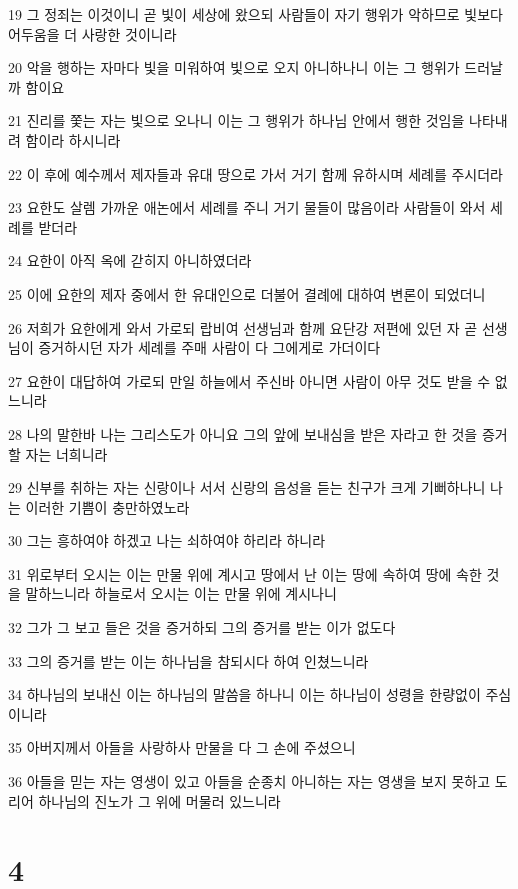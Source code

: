 \par 19 그 정죄는 이것이니 곧 빛이 세상에 왔으되 사람들이 자기 행위가 악하므로 빛보다 어두움을 더 사랑한 것이니라
\par 20 악을 행하는 자마다 빛을 미워하여 빛으로 오지 아니하나니 이는 그 행위가 드러날까 함이요
\par 21 진리를 쫓는 자는 빛으로 오나니 이는 그 행위가 하나님 안에서 행한 것임을 나타내려 함이라 하시니라
\par 22 이 후에 예수께서 제자들과 유대 땅으로 가서 거기 함께 유하시며 세례를 주시더라
\par 23 요한도 살렘 가까운 애논에서 세례를 주니 거기 물들이 많음이라 사람들이 와서 세례를 받더라
\par 24 요한이 아직 옥에 갇히지 아니하였더라
\par 25 이에 요한의 제자 중에서 한 유대인으로 더불어 결례에 대하여 변론이 되었더니
\par 26 저희가 요한에게 와서 가로되 랍비여 선생님과 함께 요단강 저편에 있던 자 곧 선생님이 증거하시던 자가 세례를 주매 사람이 다 그에게로 가더이다
\par 27 요한이 대답하여 가로되 만일 하늘에서 주신바 아니면 사람이 아무 것도 받을 수 없느니라
\par 28 나의 말한바 나는 그리스도가 아니요 그의 앞에 보내심을 받은 자라고 한 것을 증거할 자는 너희니라
\par 29 신부를 취하는 자는 신랑이나 서서 신랑의 음성을 듣는 친구가 크게 기뻐하나니 나는 이러한 기쁨이 충만하였노라
\par 30 그는 흥하여야 하겠고 나는 쇠하여야 하리라 하니라
\par 31 위로부터 오시는 이는 만물 위에 계시고 땅에서 난 이는 땅에 속하여 땅에 속한 것을 말하느니라 하늘로서 오시는 이는 만물 위에 계시나니
\par 32 그가 그 보고 들은 것을 증거하되 그의 증거를 받는 이가 없도다
\par 33 그의 증거를 받는 이는 하나님을 참되시다 하여 인쳤느니라
\par 34 하나님의 보내신 이는 하나님의 말씀을 하나니 이는 하나님이 성령을 한량없이 주심이니라
\par 35 아버지께서 아들을 사랑하사 만물을 다 그 손에 주셨으니
\par 36 아들을 믿는 자는 영생이 있고 아들을 순종치 아니하는 자는 영생을 보지 못하고 도리어 하나님의 진노가 그 위에 머물러 있느니라

\chapter{4}

